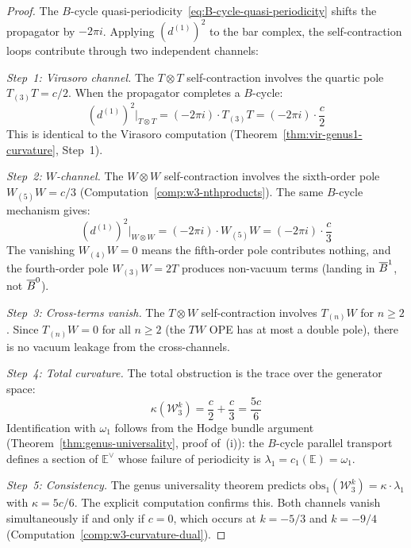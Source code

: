 \begin{proof}
The $B$-cycle quasi-periodicity~\eqref{eq:B-cycle-quasi-periodicity}
shifts the propagator by $-2\pi i$.  Applying $(d^{(1)})^2$ to the
bar complex, the self-contraction loops contribute through two
independent channels:

\emph{Step~1: Virasoro channel.}
The $T \otimes T$ self-contraction involves the quartic pole
$T_{(3)}T = c/2$.  When the propagator completes a $B$-cycle:
\begin{equation}
(d^{(1)})^2\big|_{T \otimes T} = (-2\pi i) \cdot T_{(3)}T
= (-2\pi i) \cdot \frac{c}{2}
\end{equation}
This is identical to the Virasoro computation
(Theorem~\ref{thm:vir-genus1-curvature}, Step~1).

\emph{Step~2: $W$-channel.}
The $W \otimes W$ self-contraction involves the sixth-order pole
$W_{(5)}W = c/3$ (Computation~\ref{comp:w3-nthproducts}).  The
same $B$-cycle mechanism gives:
\begin{equation}
(d^{(1)})^2\big|_{W \otimes W} = (-2\pi i) \cdot W_{(5)}W
= (-2\pi i) \cdot \frac{c}{3}
\end{equation}
The vanishing $W_{(4)}W = 0$ means the fifth-order pole
contributes nothing, and the fourth-order pole $W_{(3)}W = 2T$
produces non-vacuum terms (landing in $\overline{B}^1$, not $\overline{B}^0$).

\emph{Step~3: Cross-terms vanish.}
The $T \otimes W$ self-contraction involves $T_{(n)}W$ for $n \geq 2$.
Since $T_{(n)}W = 0$ for all $n \geq 2$ (the $TW$ OPE has at most a
double pole), there is no vacuum leakage from the cross-channels.

\emph{Step~4: Total curvature.}
The total obstruction is the trace over the generator space:
\begin{equation}
\kappa(\mathcal{W}_3^k) = \frac{c}{2} + \frac{c}{3} = \frac{5c}{6}
\end{equation}
Identification with $\omega_1$ follows from the Hodge bundle argument
(Theorem~\ref{thm:genus-universality}, proof of~(i)): the $B$-cycle
parallel transport defines a section of $\mathbb{E}^\vee$ whose
failure of periodicity is $\lambda_1 = c_1(\mathbb{E}) = \omega_1$.

\emph{Step~5: Consistency.}
The genus universality theorem predicts
$\mathrm{obs}_1(\mathcal{W}_3^k) = \kappa \cdot \lambda_1$ with
$\kappa = 5c/6$.  The explicit computation confirms this.
Both channels vanish simultaneously if and only if $c = 0$,
which occurs at $k = -5/3$ and $k = -9/4$
(Computation~\ref{comp:w3-curvature-dual}).
\end{proof}

